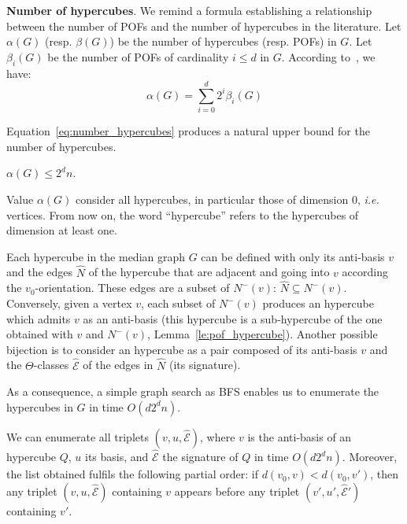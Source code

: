 \documentclass[a4paper,UKenglish,numberwithinsect,cleveref, autoref,anonymous]{lipics-v2021}
\begin{document}
\textbf{Number of hypercubes}. We remind a formula establishing a relationship between the number of POFs and the number of hypercubes in the literature. Let $\alpha(G)$ (resp. $\beta(G)$) be the number of hypercubes (resp. POFs) in $G$. Let $\beta_i(G)$ be the number of POFs of cardinality $i \le d$ in $G$. According to~\cite{BaQuSaMa02,Ko09}, we have:
\begin{equation}
\alpha(G) = \sum_{i=0}^d 2^i\beta_i(G)
\label{eq:number_hypercubes}
\end{equation}

Equation~\eqref{eq:number_hypercubes} produces a natural upper bound for the number of hypercubes.

\begin{lemma}
$\alpha(G)\le 2^dn$.
\label{le:number_hypercubes}
\end{lemma}

Value $\alpha(G)$ consider all hypercubes, in particular those of dimension 0, {\em i.e.} vertices. From now on, the word ``hypercube'' refers to the hypercubes of dimension at least one.

Each hypercube in the median graph $G$ can be defined with only its anti-basis $v$ and the edges $\widehat{N}$ of the hypercube that are adjacent and going into $v$ according the $v_0$-orientation. These edges are a subset of $N^-(v)$: $\widehat{N} \subseteq N^-(v)$. Conversely, given a vertex $v$, each subset of $N^-(v)$ produces an hypercube which admits $v$ as an anti-basis (this hypercube is a sub-hypercube of the one obtained with $v$ and $N^-(v)$, Lemma~\ref{le:pof_hypercube}). Another possible bijection is to consider an hypercube as a pair composed of its anti-basis $v$ and the $\Theta$-classes $\widehat{\mathcal{E}}$ of the edges in $\widehat{N}$ (its signature).

As a consequence, a simple graph search as BFS enables us to enumerate the hypercubes in $G$ in time $O(d2^dn)$.

\begin{lemma}
We can enumerate all triplets $(v,u,\widehat{\mathcal{E}})$, where $v$ is the anti-basis of an hypercube $Q$, $u$ its basis, and $\widehat{\mathcal{E}}$ the signature of $Q$ in time $O(d2^dn)$. Moreover, the list obtained fulfils the following partial order: if $d(v_0,v) < d(v_0,v')$, then any triplet $(v,u,\widehat{\mathcal{E}})$ containing $v$ appears before any triplet $(v',u',\widehat{\mathcal{E}}')$ containing $v'$.
\label{le:enum_hypercubes}
\end{lemma}
\end{document}
